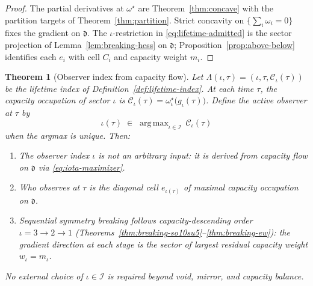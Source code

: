 \documentclass[11pt]{article}
\theoremstyle{plain}
\newtheorem{theorem}{Theorem}[section]
\theoremstyle{definition}
\theoremstyle{remark}
\numberwithin{equation}{section}
\newcommand{\capacity}{\mathcal{C}}
\DeclareMathOperator{\argmax}{arg\,max}
\begin{document}
\begin{proof}
The partial derivatives at $\omega^\star$ are Theorem~\ref{thm:concave} with
the partition targets of Theorem~\ref{thm:partition}. Strict concavity on
$\{\sum_i\omega_i=0\}$ fixes the gradient on $\mathfrak{d}$. The
$\iota$-restriction in \eqref{eq:lifetime-admitted} is the sector projection
of Lemma~\ref{lem:breaking-hess} on $\mathfrak{d}$; Proposition~\ref{prop:above-below}
identifies each $e_i$ with cell $C_i$ and capacity weight $m_i$.
\end{proof}

\begin{theorem}[Observer index from capacity flow]\label{thm:iota-derived}
Let $\Lambda(\iota,\tau)=(\iota,\tau,\capacity_\iota(\tau))$ be the lifetime
index of Definition~\ref{def:lifetime-index}. At each time $\tau$, the
capacity occupation of sector $\iota$ is
$\capacity_\iota(\tau)=\omega^\star_\iota\bigl(g_\iota(\tau)\bigr)$.
Define the \emph{active observer} at $\tau$ by
\begin{equation}\label{eq:iota-maximizer}
  \iota(\tau)\;\in\;\argmax_{\iota\in\mathcal{I}}\,\capacity_\iota(\tau)
\end{equation}
when the argmax is unique. Then:
\begin{enumerate}[label=(\roman*),leftmargin=*]
  \item The observer index $\iota$ is \emph{not} an arbitrary input: it is
    derived from capacity flow on $\mathfrak{d}$ via
    \eqref{eq:iota-maximizer}.
  \item \emph{Who observes at $\tau$} is the diagonal cell $e_{\iota(\tau)}$
    of maximal capacity occupation on $\mathfrak{d}$.
  \item Sequential symmetry breaking follows capacity-descending order
    $\iota=3\to2\to1$
    (Theorems~\ref{thm:breaking-so10su5}--\ref{thm:breaking-ew}): the gradient
    direction at each stage is the sector of largest residual capacity weight
    $w_\iota=m_\iota$.
\end{enumerate}
No external choice of $\iota\in\mathcal{I}$ is required beyond void, mirror,
and capacity balance.
\end{theorem}
\end{document}
